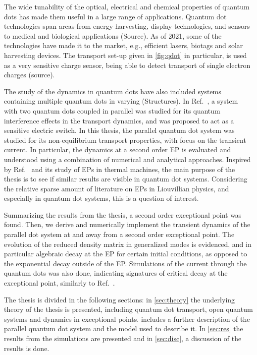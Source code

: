 \documentclass[../main.tex]{subfiles}
\begin{document}
The wide tunability of the optical, electrical and chemical properties of quantum dots has made them useful in a large range of applications. Quantum dot technologies span areas from energy harvesting, display technologies, and sensors to medical and biological applications (Source). As of 2021, some of the technologies have made it to the market, e.g., efficient lasers, biotags and solar harvesting devices. The transport set-up given in \cref{fig:qdot} in particular, is used as a very sensitive charge sensor, being able to detect transport of single electron charges (source). 

The study of the dynamics in quantum dots have also included systems containing multiple quantum dots in varying (Structures). In Ref.~\cite{doubledot}, a system with two quantum dots coupled in parallel was studied for its quantum interference effects in the transport dynamics, and was proposed to act as a sensitive electric switch. In this thesis, the parallel quantum dot system was studied for its non-equilibrium transport properties, with focus on the transient current. In particular, the dynamics at a second order EP is evaluated and understood using a combination of numerical and analytical approaches. Inspired by Ref.~\cite{thermal} and its study of EPs in thermal machines, the main purpose of the thesis is to see if similar results are visible in quantum dot systems. Considering the relative sparse amount of literature on EPs in Liouvillian physics, and especially in quantum dot systems, this is a question of interest.

Summarizing the results from the thesis, a second order exceptional point was found. Then, we derive and numerically implement the transient dynamics of the parallel dot system at and away from a second order exceptional point. The evolution of the reduced density matrix in generalized modes is evidenced, and in particular algebraic decay at the EP for certain initial conditions, as opposed to the exponential decay outside of the EP. Simulations of the current through the quantum dots was also done, indicating signatures of critical decay at the exceptional point, similarly to Ref.~\cite{thermal}.

The thesis is divided in the following sections: in \cref{sec:theory} the underlying theory of the thesis is presented, including quantum dot transport, open quantum systems and dynamics in exceptional points.  includes a further description of the parallel quantum dot system and the model used to describe it. In \cref{sec:res} the results from the simulations are presented and in \cref{sec:disc}, a discussion of the results is done.
\end{document}
